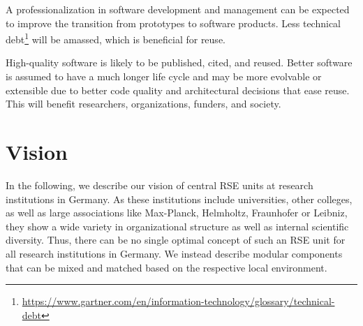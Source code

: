 \documentclass[a4paper]{article}
\begin{document}

A professionalization in software development and management can be expected to improve the transition from prototypes to software products.%
Less technical debt\footnote{\url{https://www.gartner.com/en/information-technology/glossary/technical-debt}} will be amassed, which is beneficial for reuse.

High-quality software is likely to be published, cited, and reused.
Better software is assumed to have a much longer life cycle and may be more evolvable or extensible due to better code quality and architectural decisions that ease reuse.
This will benefit researchers, organizations, funders, and society.







\section{Vision}%
\label{sec:vision}
In the following, we describe our vision of central RSE units at research institutions in Germany.
As these institutions include universities, other colleges, as well as large associations like Max-Planck, Helmholtz, Fraunhofer or Leibniz,
they show a wide variety in organizational structure as well as internal scientific diversity.
Thus, there can be no single optimal concept of such an RSE unit for all research institutions in Germany.
We instead describe modular components that can be mixed and matched based on the respective local environment.
\end{document}
